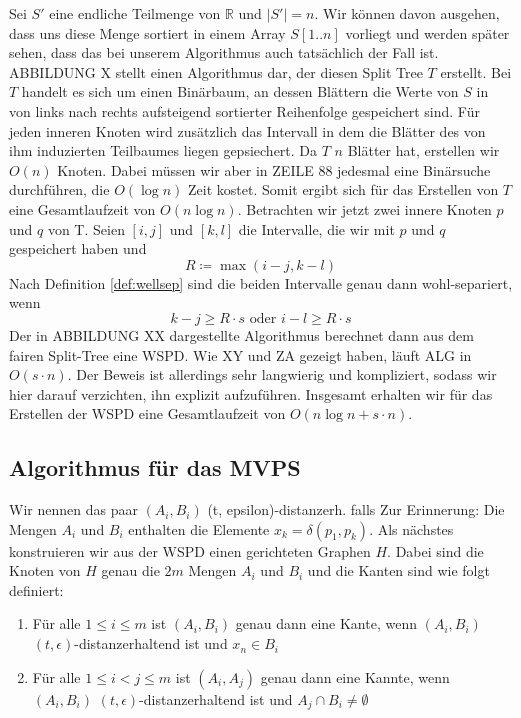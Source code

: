 \documentclass[11pt]{article}
\newcommand{\R}{\mathbb{R}}
\begin{document}
	Sei $S'$ eine endliche Teilmenge von $\R$ und $|S'| = n$. Wir können davon ausgehen, dass uns diese Menge sortiert in einem Array $S[1..n]$ vorliegt und werden später sehen, dass das bei unserem Algorithmus auch tatsächlich der Fall ist. ABBILDUNG X stellt einen Algorithmus dar, der diesen Split Tree $T$ erstellt. Bei $T$ handelt es sich um einen Binärbaum, an dessen Blättern die Werte von $S$ in von links nach rechts aufsteigend sortierter Reihenfolge gespeichert sind. Für jeden inneren Knoten wird zusätzlich das Intervall in dem die Blätter des von ihm induzierten Teilbaumes liegen gepsiechert.
	Da $T$ $n$ Blätter hat, erstellen wir $O(n)$ Knoten. Dabei müssen wir aber in ZEILE 88 jedesmal eine Binärsuche durchführen, die $O(\log n)$ Zeit kostet. Somit ergibt sich für das Erstellen von $T$ eine Gesamtlaufzeit von $O(n\log n)$.
	Betrachten wir jetzt zwei innere Knoten $p$ und $q$ von T. Seien $[i, j]$ und $[k, l]$ die Intervalle, die wir mit $p$ und $q$ gespeichert haben und 
	\[R \coloneqq \max(i - j, k - l)\]
	Nach Definition \ref{def:wellsep} sind die beiden Intervalle genau dann wohl-separiert, wenn 
	\[k - j \geq R \cdot s \text{ oder } i - l \geq R \cdot s \]
	Der in ABBILDUNG XX dargestellte Algorithmus berechnet dann aus dem fairen Split-Tree eine WSPD. Wie XY und ZA gezeigt haben, läuft ALG in $O(s\cdot n)$. Der Beweis ist allerdings sehr langwierig und kompliziert, sodass wir hier darauf verzichten, ihn explizit aufzuführen. Insgesamt erhalten wir für das Erstellen der WSPD eine Gesamtlaufzeit von $O(n\log n + s\cdot n).$
    \subsection{Algorithmus für das MVPS}
    \label{subsec:mvps}
    \textellipsis Wir nennen das paar $(A_i, B_i)$ (t, epsilon)-distanzerh. falls \textellipsis
    Zur Erinnerung: Die Mengen $A_i$ und $B_i$ enthalten die Elemente $x_k = \delta(p_1, p_k)$.
    Als nächstes konstruieren wir aus der WSPD einen gerichteten Graphen $H$. Dabei sind die Knoten von $H$ genau die $2m$ Mengen $A_i$ und $B_i$ und die Kanten sind wie folgt definiert:
    \begin{enumerate}
    	\item Für alle $1 \leq i \leq m$ ist $(A_i, B_i)$ genau dann eine Kante, wenn $(A_i, B_i)$ $(t, \epsilon)$-distanzerhaltend ist und $x_n \in B_i$
    	\item Für alle $1\leq i < j \leq m$ ist $(A_i, A_j)$ genau dann eine Kannte, wenn $(A_i, B_i)$ $(t, \epsilon)$-distanzerhaltend ist und $A_j \cap B_i \neq \emptyset$
    \end{enumerate}
\end{document}
